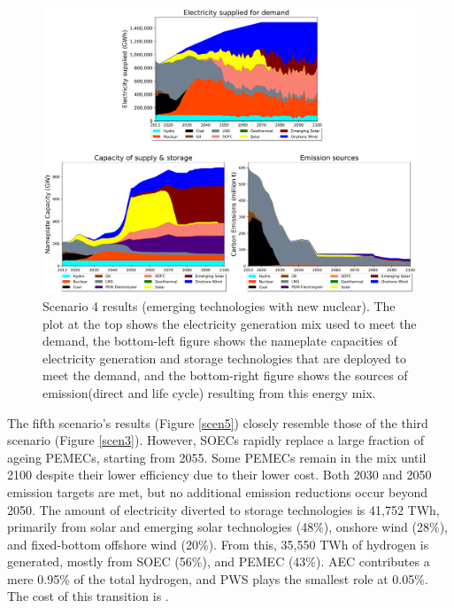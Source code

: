 \begin{figure}[H] 
\centering
\includegraphics[scale=0.5]{figures/newtechs_nuc}
\caption{Scenario 4 results (emerging technologies with new nuclear). The plot at the top shows the electricity generation mix used to meet the demand, the bottom-left figure shows the nameplate capacities of electricity generation and storage technologies that are deployed to meet the demand, and the bottom-right figure shows the sources of emission(direct and life cycle) resulting from this energy mix.}
\label{scen4}
\end{figure}

The fifth scenario's results (Figure \ref{scen5}) closely resemble those of the third scenario (Figure \ref{scen3}). However, \gls{SOEC}s rapidly replace a large fraction of ageing \gls{PEMEC}s, starting from 2055. Some \gls{PEMEC}s remain in the mix until 2100 despite their lower efficiency due to their lower cost. Both 2030 and 2050 emission targets are met, but no additional emission reductions occur beyond 2050. The amount of electricity diverted to storage technologies is 41,752 TWh, primarily from solar and emerging solar technologies (48\%), onshore wind (28\%), and fixed-bottom offshore wind (20\%). From this, 35,550 TWh of hydrogen is generated, mostly from \gls{SOEC} (56\%), and \gls{PEMEC} (43\%). \gls{AEC} contributes a mere 0.95\% of the total hydrogen, and \gls{PWS} plays the smallest role at 0.05\%. The cost of this transition is \DIFdelbegin \textbf{}%
\DIFdelend \DIFaddbegin {}\DIFaddend .

